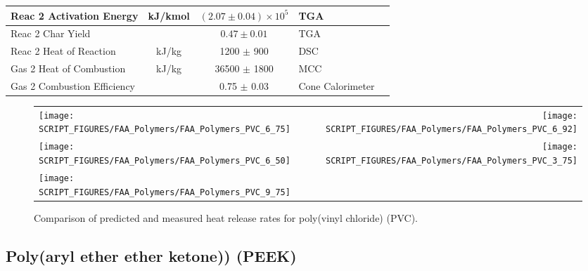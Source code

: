\begin{table}[h!]
\begin{center}
\begin{tabular}{|l|c|c|l|l|}
Reac 2 Activation Energy    & kJ/kmol       & $(2.07 \pm 0.04) \times 10^{5}$   & TGA                       &  \cite{Stoliarov:CF2010}                  \\ \hline
Reac 2 Char Yield           &               & $0.47 \pm 0.01$                   & TGA                       &  \cite{Stoliarov:CF2010}                  \\ \hline
Reac 2 Heat of Reaction     & kJ/kg         & 1200 $\pm$ 900                    & DSC                       &  \cite{Stoliarov:PDS2008}                 \\ \hline
Gas 2 Heat of Combustion    & kJ/kg         & 36500 $\pm$ 1800                  & MCC                       &  \cite{Stoliarov:CF2010}                  \\ \hline
Gas 2 Combustion Efficiency &               & 0.75 $\pm$ 0.03                   & Cone Calorimeter          &  \cite{Stoliarov:CF2010}                  \\ \hline
\end{tabular}
\end{center}
\label{Properties_PVC}
\end{table}

\begin{figure}[p]
\begin{tabular*}{\textwidth}{l@{\extracolsep{\fill}}r}
\texttt{[image: SCRIPT\_FIGURES/FAA\_Polymers/FAA\_Polymers\_PVC\_6\_75]} &
\texttt{[image: SCRIPT\_FIGURES/FAA\_Polymers/FAA\_Polymers\_PVC\_6\_92]} \\
\texttt{[image: SCRIPT\_FIGURES/FAA\_Polymers/FAA\_Polymers\_PVC\_6\_50]} &
\texttt{[image: SCRIPT\_FIGURES/FAA\_Polymers/FAA\_Polymers\_PVC\_3\_75]} \\
\texttt{[image: SCRIPT\_FIGURES/FAA\_Polymers/FAA\_Polymers\_PVC\_9\_75]} &
\end{tabular*}
\caption[Heat release rate of poly(vinyl chloride) (PVC).]{Comparison of predicted and measured heat release rates for poly(vinyl chloride) (PVC).}
\label{HRR_PVC}
\end{figure}

\clearpage



\subsection{Poly(aryl ether ether ketone)) (PEEK)}

